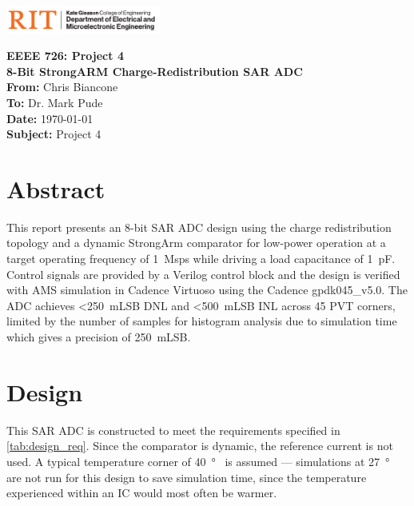 \documentclass[11pt,letterpaper]{article}
\begin{document}
\VerbatimFootnotes %


	\hspace{4.5in}
	\includegraphics[width=2in,trim=0cm 0in 0in 0.0in,clip]{images/COE_EME_1505C_hor_k1.pdf}
\newline

\Huge\textbf{EEEE 726: Project 4 \\8-Bit StrongARM Charge-Redistribution SAR ADC}\\

\Large
\textbf{From:} Chris Biancone \\
\textbf{To: } Dr. Mark Pude \\
\textbf{Date: } \today \\
\textbf{Subject: } Project 4\\
\vspace{0.5in}

\section*{Abstract}
\normalsize
This report presents an 8-bit SAR ADC design using the charge redistribution topology and a dynamic StrongArm comparator for low-power operation at a target operating frequency of \qty{1}{Msps} while driving a load capacitance of \qty{1}{\pF}. Control signals are provided by a Verilog control block and the design is verified with AMS simulation in Cadence Virtuoso using the Cadence gpdk045\_v5.0. The ADC achieves <\qty{250}{mLSB} DNL and <\qty{500}{mLSB} INL across 45 PVT corners, limited by the number of samples for histogram analysis due to simulation time which gives a precision of \qty{250}{mLSB}. 

\section{Design}

This SAR ADC is constructed to meet the requirements specified in \cref{tab:design_req}. Since the comparator is dynamic, the reference current is not used. A typical temperature corner of \qty{40}{\degree\C} is assumed --- simulations at \qty{27}{\degree\C} are not run for this design to save simulation time, since the temperature experienced within an IC would most often be warmer.
\end{document}
